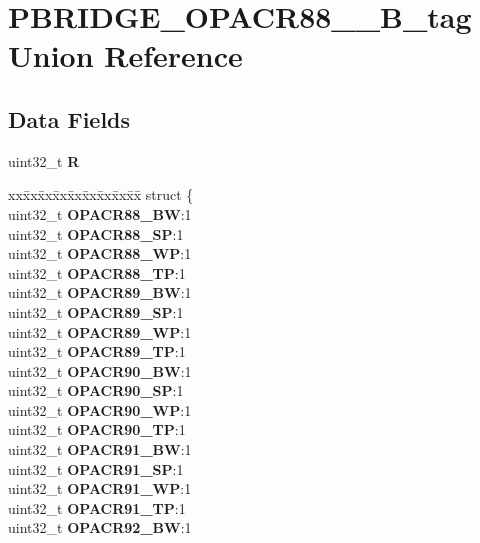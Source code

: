 \hypertarget{unionPBRIDGE__OPACR88__95__32B__tag}{}\section{P\+B\+R\+I\+D\+G\+E\+\_\+\+O\+P\+A\+C\+R88\+\_\+\_\+B\+\_\+tag Union Reference}
\label{unionPBRIDGE__OPACR88__95__32B__tag}
\subsection*{Data Fields}
\begin{DoxyCompactItemize}
\item 
\mbox{\label{unionPBRIDGE__OPACR88__95__32B__tag_ae01d81da91bdab2d6694106bc603a62d}} 
uint32\+\_\+t {\bfseries R}
\item 
\mbox{\label{unionPBRIDGE__OPACR88__95__32B__tag_a7aa0564710eb76752e5227b56dc5205f}} 
\begin{tabbing}
xx\=xx\=xx\=xx\=xx\=xx\=xx\=xx\=xx\=\kill
struct \{\\
\>uint32\_t {\bfseries OPACR88\_BW}:1\\
\>uint32\_t {\bfseries OPACR88\_SP}:1\\
\>uint32\_t {\bfseries OPACR88\_WP}:1\\
\>uint32\_t {\bfseries OPACR88\_TP}:1\\
\>uint32\_t {\bfseries OPACR89\_BW}:1\\
\>uint32\_t {\bfseries OPACR89\_SP}:1\\
\>uint32\_t {\bfseries OPACR89\_WP}:1\\
\>uint32\_t {\bfseries OPACR89\_TP}:1\\
\>uint32\_t {\bfseries OPACR90\_BW}:1\\
\>uint32\_t {\bfseries OPACR90\_SP}:1\\
\>uint32\_t {\bfseries OPACR90\_WP}:1\\
\>uint32\_t {\bfseries OPACR90\_TP}:1\\
\>uint32\_t {\bfseries OPACR91\_BW}:1\\
\>uint32\_t {\bfseries OPACR91\_SP}:1\\
\>uint32\_t {\bfseries OPACR91\_WP}:1\\
\>uint32\_t {\bfseries OPACR91\_TP}:1\\
\>uint32\_t {\bfseries OPACR92\_BW}:1\\

\end{tabbing}
\end{DoxyCompactItemize}

